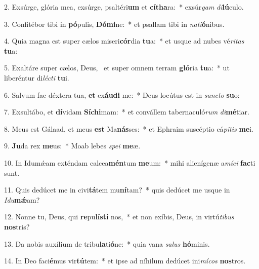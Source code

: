 2. Exsúrge, glória mea, exsúrge, psaltéri\textbf{um} et \textbf{cí}\textbf{tha}ra:~*  exsúr\textit{gam} \textit{di}\textbf{lú}culo.\

3. Confitébor tibi in \textbf{pó}pulis, \textbf{Dó}\textbf{mi}ne:~*  et psallam tibi in \textit{na}\textit{ti}\textbf{ó}nibus.\

4. Quia magna est super cælos miseri\textbf{cór}dia \textbf{tu}a:~*  et usque ad nubes vé\textit{ri}\textit{tas} \textbf{tu}a:\

5. Exaltáre super cælos, Deus, \dag\  et super omnem terram \textbf{gló}ria \textbf{tu}a:~*  ut liberéntur di\textit{léc}\textit{ti} \textbf{tu}i.\

6. Salvum fac déxtera tua, \textbf{et} ex\textbf{áu}\textbf{di} me:~*  Deus locútus est in \textit{sanc}\textit{to} \textbf{su}o:\

7. Exsultábo, et \textbf{dí}vidam \textbf{Sí}\textbf{chi}mam:~*  et convállem tabernaculó\textit{rum} \textit{di}\textbf{mé}tiar.\

8. Meus est Gálaad, et meus \textbf{est} Ma\textbf{nás}ses:~*  et Ephraim suscéptio cá\textit{pi}\textit{tis} \textbf{me}i.\

9. \textbf{Ju}da rex \textbf{me}us:~*  Moab lebes \textit{spe}\textit{i} \textbf{me}æ.\

10. In Idumǽam exténdam calcea\textbf{mén}tum \textbf{me}um:~*  mihi alienígenæ a\textit{mí}\textit{ci} \textbf{fac}ti sunt.\

11. Quis dedúcet me in civi\textbf{tá}tem mu\textbf{ní}tam?~*  quis dedúcet me usque in \textit{I}\textit{du}\textbf{mǽ}am?\

12. Nonne tu, Deus, qui \textbf{re}pu\textbf{lís}\textbf{ti} nos,~*  et non exíbis, Deus, in virtú\textit{ti}\textit{bus} \textbf{nos}tris?\

13. Da nobis auxílium de tribu\textbf{la}ti\textbf{ó}ne:~*  quia vana \textit{sa}\textit{lus} \textbf{hó}minis.\

14. In Deo faci\textbf{é}mus vir\textbf{tú}tem:~*  et ipse ad níhilum dedúcet ini\textit{mí}\textit{cos} \textbf{nos}tros.\

